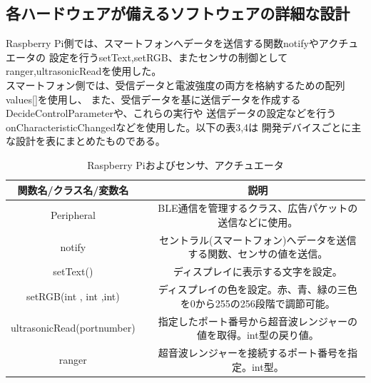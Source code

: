 \documentclass[dvipdfmx,autodetect-engine,titlepage]{jsarticle}
\begin{document}
  \subsection{各ハードウェアが備えるソフトウェアの詳細な設計}
  Raspberry Pi側では、スマートフォンへデータを送信する関数notifyやアクチュエータの
  設定を行うsetText,setRGB、またセンサの制御としてranger,ultrasonicReadを使用した。\\
  スマートフォン側では、受信データと電波強度の両方を格納するための配列values[]を使用し、
  また、受信データを基に送信データを作成するDecideControlParameterや、これらの実行や
  送信データの設定などを行うonCharacteristicChangedなどを使用した。以下の表3,4は
  開発デバイスごとに主な設計を表にまとめたものである。
  \begin{table}[h]
    \centering
    \caption{Raspberry Piおよびセンサ、アクチュエータ}
    \begin{tabular}{clc}
    \hline
    関数名/クラス名/変数名                   &  & 説明                                      \\ \hline\hline
    Peripheral                 &  & BLE通信を管理するクラス、広告パケットの送信などに使用。           \\ \hline
    notify                     &  & セントラル(スマートフォン)へデータを送信する関数、センサの値を送信。     \\ \hline
    setText()                  &  & ディスプレイに表示する文字を設定。                       \\ \hline
    setRGB(int , int ,int)     &  & ディスプレイの色を設定。赤、青、緑の三色を0から255の256段階で調節可能。 \\ \hline
    ultrasonicRead(portnumber) &  & 指定したポート番号から超音波レンジャーの値を取得。int型の戻り値。      \\ \hline
    ranger                     &  & 超音波レンジャーを接続するポート番号を指定。int型。                  \\ \hline
    \end{tabular}
    \end{table}
\end{document}
